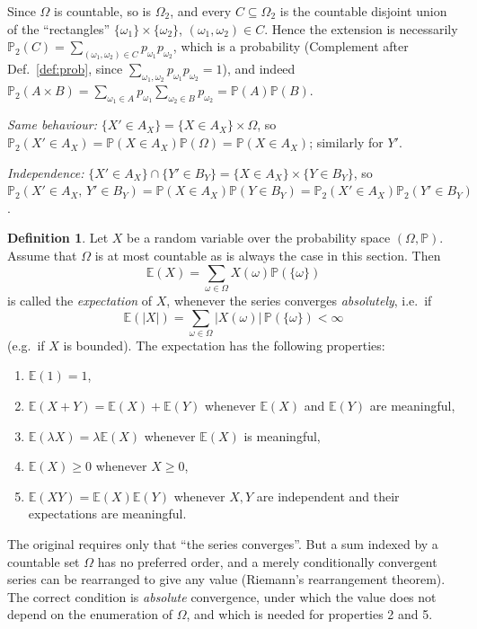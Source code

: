 \documentclass[11pt,a4paper]{article}
\numberwithin{equation}{section}
\newcommand{\PP}{\mathbb{P}}
\newcommand{\E}{\mathbb{E}}
\theoremstyle{plain}
\theoremstyle{definition}
\newtheorem{definition}[theorem]{Definition}
\theoremstyle{plain}
\theoremstyle{definition}
\begin{document}
\begin{addition}
Since $\Omega$ is countable, so is $\Omega_2$, and every $C\subseteq\Omega_2$ is the
countable disjoint union of the ``rectangles'' $\{\omega_1\}\times\{\omega_2\}$,
$(\omega_1,\omega_2)\in C$. Hence the extension is necessarily
$\PP_2(C)=\sum_{(\omega_1,\omega_2)\in C}p_{\omega_1}p_{\omega_2}$, which is a probability
(Complement after Def.~\ref{def:prob}, since $\sum_{\omega_1,\omega_2}p_{\omega_1}p_{\omega_2}=1$),
and indeed $\PP_2(A\times B)=\sum_{\omega_1\in A}p_{\omega_1}\sum_{\omega_2\in B}p_{\omega_2}=\PP(A)\PP(B)$.

\emph{Same behaviour:} $\{X'\in A_X\}=\{X\in A_X\}\times\Omega$, so
$\PP_2(X'\in A_X)=\PP(X\in A_X)\PP(\Omega)=\PP(X\in A_X)$; similarly for $Y'$.

\emph{Independence:} $\{X'\in A_X\}\cap\{Y'\in B_Y\}=\{X\in A_X\}\times\{Y\in B_Y\}$, so
$\PP_2(X'\in A_X,\,Y'\in B_Y)=\PP(X\in A_X)\PP(Y\in B_Y)=\PP_2(X'\in A_X)\PP_2(Y'\in B_Y)$.
\end{addition}

\begin{definition}\label{def:expect}
Let $X$ be a random variable over the probability space $(\Omega,\PP)$. Assume that
$\Omega$ is at most countable as is always the case in this section. Then
\[
\E(X)=\sum_{\omega\in\Omega}X(\omega)\PP(\{\omega\})
\]
is called the \emph{expectation} of $X$, whenever the series converges \emph{absolutely},
i.e.\ if
\[
\E(|X|)=\sum_{\omega\in\Omega}|X(\omega)|\,\PP(\{\omega\})<\infty
\]
(e.g.\ if $X$ is bounded).
The expectation has the following properties:
\begin{enumerate}
\item $\E(1)=1$,
\item $\E(X+Y)=\E(X)+\E(Y)$ whenever $\E(X)$ and $\E(Y)$ are meaningful,
\item $\E(\lambda X)=\lambda\E(X)$ whenever $\E(X)$ is meaningful,
\item $\E(X)\geqslant0$ whenever $X\geqslant0$,
\item $\E(XY)=\E(X)\E(Y)$ whenever $X,Y$ are independent and their expectations are meaningful.
\end{enumerate}
\end{definition}

\begin{correction}[(Def.~3.11)]
The original requires only that ``the series converges''. But a sum indexed by a countable
set $\Omega$ has no preferred order, and a merely conditionally convergent series can be
rearranged to give any value (Riemann's rearrangement theorem). The correct condition is
\emph{absolute} convergence, under which the value does not depend on the enumeration of
$\Omega$, and which is needed for properties 2 and 5.
\end{correction}
\end{document}
